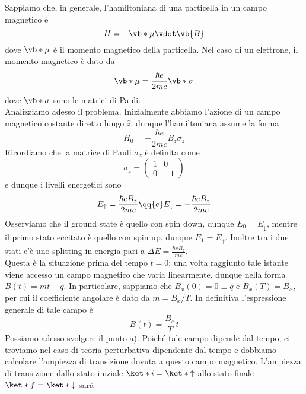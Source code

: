 \begin{soluzione}
   Sappiamo che, in generale, l'hamiltoniana di una particella in un campo magnetico è
   \begin{equation*}
      H=-\vb*{\mu} \vdot \vb{B}
   \end{equation*}
   dove $\vb*{\mu}$ è il momento magnetico della particella. Nel caso di un elettrone, il momento magnetico è dato da
   \begin{equation*}
      \vb*{\mu}
      =\frac{\hbar e}{2 m c} \vb*{\sigma}
   \end{equation*}
   dove $\vb*{\sigma}$ sono le matrici di Pauli.\\
   Analizziamo adesso il problema. Inizialmente abbiamo l'azione di un campo magnetico costante diretto lungo $\hat{z}$, dunque l'hamiltoniana assume la forma
   \begin{equation*}
      H_0=-\frac{\hbar e}{2 m c} B_z \sigma_z
   \end{equation*}
   Ricordiamo che la matrice di Pauli $\sigma_z$ è definita come
   \begin{equation*}
      \sigma_z
      =
      \begin{pmatrix}
         1 & 0 \\
         0 & -1
      \end{pmatrix}
   \end{equation*}
   e dunque i livelli energetici sono
   \begin{equation*}
      E_{\uparrow}=\frac{\hbar e B_z}{2 m c}
      \qq{e}
      E_{\downarrow}=-\frac{\hbar e B_z}{2 m c}
   \end{equation*}
   Osserviamo che il ground state è quello con spin down, dunque $E_0=E_{\downarrow}$, mentre il primo stato eccitato è quello con spin up, dunque $E_1=E_{\uparrow}$. Inoltre tra i due stati c'è uno splitting in energia pari a $\Delta E=\frac{\hbar e B_z}{mc}$.\\
   Questa è la situazione prima del tempo $t=0$; una volta raggiunto tale istante viene accesso un campo magnetico che varia linearmente, dunque nella forma $B(t)=mt + q$. In particolare, sappiamo che $B_x(0)=0 \equiv q$ e $B_x(T)=B_x$, per cui il coefficiente angolare è dato da $m=B_x/T$. In definitiva l'espressione generale di tale campo è
   \begin{equation*}
      B(t)=\frac{B_x}{T}t
   \end{equation*}
   Possiamo adesso svolgere il punto a). Poiché tale campo dipende dal tempo, ci troviamo nel caso di teoria perturbativa dipendente dal tempo e dobbiamo calcolare l'ampiezza di transizione dovuta a questo campo magnetico. L'ampiezza di transizione dallo stato iniziale $\ket*{i}=\ket*{\uparrow}$ allo stato finale $\ket*{f}=\ket*{\downarrow}$ sarà

\end{soluzione}
